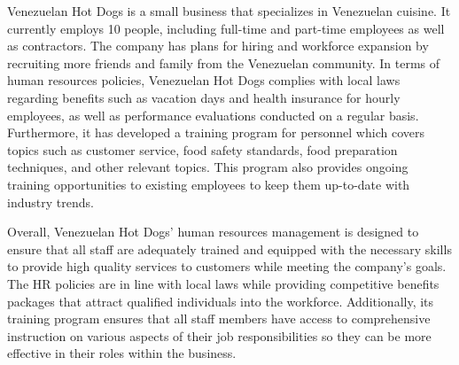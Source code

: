 

Venezuelan Hot Dogs is a small business that specializes in Venezuelan cuisine. It currently employs 10 people, including full-time and part-time employees as well as contractors. The company has plans for hiring and workforce expansion by recruiting more friends and family from the Venezuelan community. In terms of human resources policies, Venezuelan Hot Dogs complies with local laws regarding benefits such as vacation days and health insurance for hourly employees, as well as performance evaluations conducted on a regular basis. Furthermore, it has developed a training program for personnel which covers topics such as customer service, food safety standards, food preparation techniques, and other relevant topics. This program also provides ongoing training opportunities to existing employees to keep them up-to-date with industry trends. 

Overall, Venezuelan Hot Dogs' human resources management is designed to ensure that all staff are adequately trained and equipped with the necessary skills to provide high quality services to customers while meeting the company's goals. The HR policies are in line with local laws while providing competitive benefits packages that attract qualified individuals into the workforce. Additionally, its training program ensures that all staff members have access to comprehensive instruction on various aspects of their job responsibilities so they can be more effective in their roles within the business.